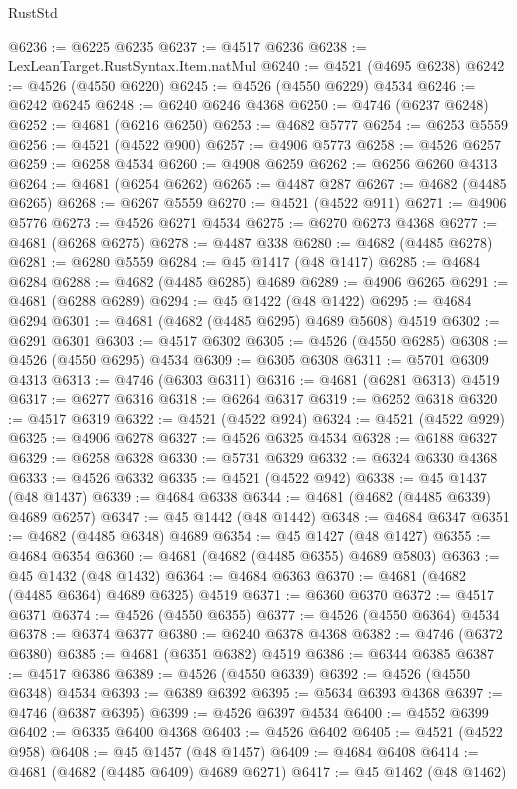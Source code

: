 \begin{lexlean}{RustStd}
\begin{coremodule}
@6236 := @6225 @6235
@6237 := @4517 @6236
@6238 := LexLeanTarget.RustSyntax.Item.natMul
@6240 := @4521 (@4695 @6238)
@6242 := @4526 (@4550 @6220)
@6245 := @4526 (@4550 @6229) @4534
@6246 := @6242 @6245
@6248 := @6240 @6246 @4368
@6250 := @4746 (@6237 @6248)
@6252 := @4681 (@6216 @6250)
@6253 := @4682 @5777
@6254 := @6253 @5559
@6256 := @4521 (@4522 @900)
@6257 := @4906 @5773
@6258 := @4526 @6257
@6259 := @6258 @4534
@6260 := @4908 @6259
@6262 := @6256 @6260 @4313
@6264 := @4681 (@6254 @6262)
@6265 := @4487 @287
@6267 := @4682 (@4485 @6265)
@6268 := @6267 @5559
@6270 := @4521 (@4522 @911)
@6271 := @4906 @5776
@6273 := @4526 @6271 @4534
@6275 := @6270 @6273 @4368
@6277 := @4681 (@6268 @6275)
@6278 := @4487 @338
@6280 := @4682 (@4485 @6278)
@6281 := @6280 @5559
@6284 := @45 @1417 (@48 @1417)
@6285 := @4684 @6284
@6288 := @4682 (@4485 @6285) @4689
@6289 := @4906 @6265
@6291 := @4681 (@6288 @6289)
@6294 := @45 @1422 (@48 @1422)
@6295 := @4684 @6294
@6301 := @4681 (@4682 (@4485 @6295) @4689 @5608) @4519
@6302 := @6291 @6301
@6303 := @4517 @6302
@6305 := @4526 (@4550 @6285)
@6308 := @4526 (@4550 @6295) @4534
@6309 := @6305 @6308
@6311 := @5701 @6309 @4313
@6313 := @4746 (@6303 @6311)
@6316 := @4681 (@6281 @6313) @4519
@6317 := @6277 @6316
@6318 := @6264 @6317
@6319 := @6252 @6318
@6320 := @4517 @6319
@6322 := @4521 (@4522 @924)
@6324 := @4521 (@4522 @929)
@6325 := @4906 @6278
@6327 := @4526 @6325 @4534
@6328 := @6188 @6327
@6329 := @6258 @6328
@6330 := @5731 @6329
@6332 := @6324 @6330 @4368
@6333 := @4526 @6332
@6335 := @4521 (@4522 @942)
@6338 := @45 @1437 (@48 @1437)
@6339 := @4684 @6338
@6344 := @4681 (@4682 (@4485 @6339) @4689 @6257)
@6347 := @45 @1442 (@48 @1442)
@6348 := @4684 @6347
@6351 := @4682 (@4485 @6348) @4689
@6354 := @45 @1427 (@48 @1427)
@6355 := @4684 @6354
@6360 := @4681 (@4682 (@4485 @6355) @4689 @5803)
@6363 := @45 @1432 (@48 @1432)
@6364 := @4684 @6363
@6370 := @4681 (@4682 (@4485 @6364) @4689 @6325) @4519
@6371 := @6360 @6370
@6372 := @4517 @6371
@6374 := @4526 (@4550 @6355)
@6377 := @4526 (@4550 @6364) @4534
@6378 := @6374 @6377
@6380 := @6240 @6378 @4368
@6382 := @4746 (@6372 @6380)
@6385 := @4681 (@6351 @6382) @4519
@6386 := @6344 @6385
@6387 := @4517 @6386
@6389 := @4526 (@4550 @6339)
@6392 := @4526 (@4550 @6348) @4534
@6393 := @6389 @6392
@6395 := @5634 @6393 @4368
@6397 := @4746 (@6387 @6395)
@6399 := @4526 @6397 @4534
@6400 := @4552 @6399
@6402 := @6335 @6400 @4368
@6403 := @4526 @6402
@6405 := @4521 (@4522 @958)
@6408 := @45 @1457 (@48 @1457)
@6409 := @4684 @6408
@6414 := @4681 (@4682 (@4485 @6409) @4689 @6271)
@6417 := @45 @1462 (@48 @1462)

\end{coremodule}
\end{lexlean}
